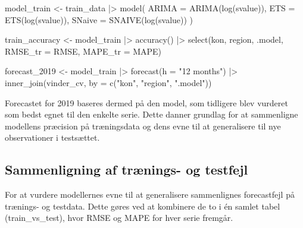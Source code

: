 \documentclass[
]{article}
\newenvironment{Shaded}{\begin{snugshade}}{\end{snugshade}}
\newcommand{\AttributeTok}[1]{\textcolor[rgb]{0.40,0.45,0.13}{#1}}
\newcommand{\FunctionTok}[1]{\textcolor[rgb]{0.28,0.35,0.67}{#1}}
\newcommand{\NormalTok}[1]{\textcolor[rgb]{0.00,0.23,0.31}{#1}}
\newcommand{\OtherTok}[1]{\textcolor[rgb]{0.00,0.23,0.31}{#1}}
\newcommand{\SpecialCharTok}[1]{\textcolor[rgb]{0.37,0.37,0.37}{#1}}
\newcommand{\StringTok}[1]{\textcolor[rgb]{0.13,0.47,0.30}{#1}}
\begin{document}
\begin{Shaded}
\begin{Highlighting}[]
\NormalTok{model\_train }\OtherTok{\textless{}{-}}\NormalTok{ train\_data }\SpecialCharTok{|\textgreater{}}
  \FunctionTok{model}\NormalTok{(}
    \AttributeTok{ARIMA  =} \FunctionTok{ARIMA}\NormalTok{(}\FunctionTok{log}\NormalTok{(svalue)),}
    \AttributeTok{ETS    =} \FunctionTok{ETS}\NormalTok{(}\FunctionTok{log}\NormalTok{(svalue)),}
    \AttributeTok{SNaive =} \FunctionTok{SNAIVE}\NormalTok{(}\FunctionTok{log}\NormalTok{(svalue))}
\NormalTok{  )}

\NormalTok{train\_accuracy }\OtherTok{\textless{}{-}}\NormalTok{ model\_train }\SpecialCharTok{|\textgreater{}} 
  \FunctionTok{accuracy}\NormalTok{() }\SpecialCharTok{|\textgreater{}} 
  \FunctionTok{select}\NormalTok{(kon, region, .model, }\AttributeTok{RMSE\_tr =}\NormalTok{ RMSE, }\AttributeTok{MAPE\_tr =}\NormalTok{ MAPE)}

\NormalTok{forecast\_2019 }\OtherTok{\textless{}{-}}\NormalTok{ model\_train }\SpecialCharTok{|\textgreater{}}
  \FunctionTok{forecast}\NormalTok{(}\AttributeTok{h =} \StringTok{"12 months"}\NormalTok{) }\SpecialCharTok{|\textgreater{}}
  \FunctionTok{inner\_join}\NormalTok{(vinder\_cv,                      }
             \AttributeTok{by =} \FunctionTok{c}\NormalTok{(}\StringTok{"kon"}\NormalTok{, }\StringTok{"region"}\NormalTok{, }\StringTok{".model"}\NormalTok{))}
\end{Highlighting}
\end{Shaded}

Forecastet for 2019 baseres dermed på den model, som tidligere blev
vurderet som bedst egnet til den enkelte serie. Dette danner grundlag
for at sammenligne modellens præcision på træningsdata og dens evne til
at generalisere til nye observationer i testsættet.

\subsection{Sammenligning af trænings- og
testfejl}\label{sammenligning-af-truxe6nings--og-testfejl}

For at vurdere modellernes evne til at generalisere sammenlignes
forecastfejl på trænings- og testdata. Dette gøres ved at kombinere de
to i én samlet tabel (train\_vs\_test), hvor RMSE og MAPE for hver serie
fremgår.
\end{document}
